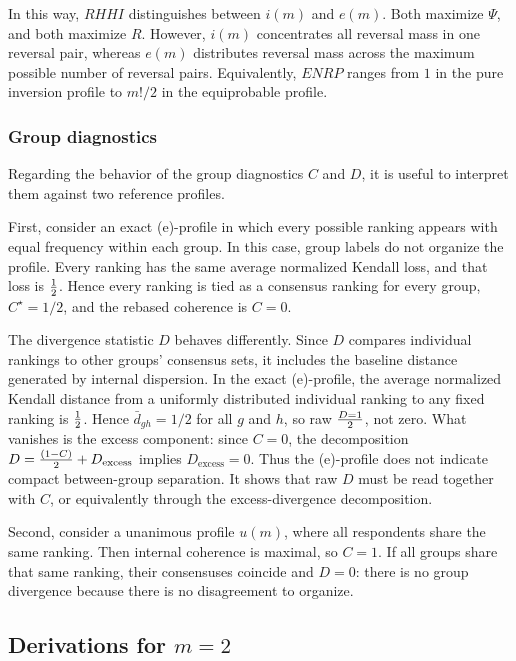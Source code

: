 \documentclass[12pt]{article}
\begin{document}
In this way, \(RHHI\) distinguishes between \(i(m)\) and \(e(m)\). Both maximize
\(\Psi\), and both maximize \(R\). However, \(i(m)\) concentrates all reversal
mass in one reversal pair, whereas \(e(m)\) distributes reversal mass across
the maximum possible number of reversal pairs. Equivalently, \(ENRP\) ranges
from \(1\) in the pure inversion profile to \(m!/2\) in the equiprobable
profile.

\subsubsection{Group diagnostics}

Regarding the behavior of the group diagnostics \(C\) and \(D\), it is useful
to interpret them against two reference profiles.

First, consider an exact (e)-profile in which every possible ranking appears
with equal frequency within each group. In this case, group labels do not
organize the profile. Every ranking has the same average normalized Kendall
loss, and that loss is \(1 \over2\). Hence every ranking is tied as a consensus
ranking for every group, \(C^{\star}=1/2\), and the rebased coherence is
\(C=0\).

The divergence statistic \(D\) behaves differently. Since \(D\) compares
individual rankings to other groups' consensus sets, it includes the baseline
distance generated by internal dispersion. In the exact (e)-profile, the
average normalized Kendall distance from a uniformly distributed individual
ranking to any fixed ranking is \(1\over 2\). Hence \(\bar d_{gh}=1/2\) for all
\(g\) and \(h\), so raw \(D=1 \over2\), not zero. What vanishes is the excess
component: since \(C=0\), the decomposition
\(D={(1-C) \over 2} + D_{\mathrm{excess}}\) implies
\(D_{\mathrm{excess}}=0\). Thus the (e)-profile does not indicate compact
between-group separation. It shows that raw \(D\) must be read together with
\(C\), or equivalently through the excess-divergence decomposition.

Second, consider a unanimous profile \(u(m)\), where all respondents share the
same ranking. Then internal coherence is maximal, so \(C=1\). If all groups
share that same ranking, their consensuses coincide and \(D=0\): there is no
group divergence because there is no disagreement to organize.


\subsection{Derivations for \(m=2\)}
\label{app:m2-derivations}
\end{document}

